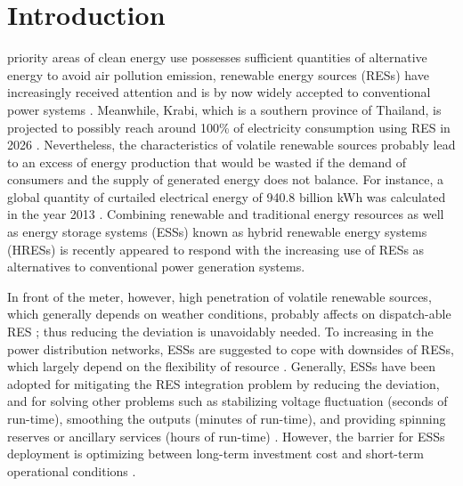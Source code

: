 \section{Introduction}
\label{sec:introduction}



 priority areas of clean energy use possesses sufficient quantities of alternative energy to avoid air pollution emission, renewable energy sources (RESs) have increasingly received attention and is by now widely accepted to conventional power systems \cite{b1,b2,b3,b4,b5-wind-data,b6}. Meanwhile, Krabi, which is a southern province of Thailand, is projected to possibly reach around 100\% of electricity consumption using RES in 2026 \cite{b7}. Nevertheless, the characteristics of volatile renewable sources probably lead to an excess of energy production that would be wasted if the demand of consumers and the supply of generated energy does not balance. For instance, a global quantity of curtailed electrical energy of 940.8 billion kWh was calculated in the year 2013 \cite{b9}. Combining renewable and traditional energy resources as well as energy storage systems (ESSs) known as hybrid renewable energy systems (HRESs) is recently appeared to respond with the increasing use of RESs as alternatives to conventional power generation systems.

\par

In front of the meter, however, high penetration of volatile renewable sources, which generally depends on weather conditions, probably affects on dispatch-able RES \cite{b10}; thus reducing the deviation is unavoidably needed. To increasing in the power distribution networks, ESSs are suggested to cope with downsides of RESs, which largely depend on the flexibility of resource \cite{b11,b12}. Generally, ESSs have been adopted for mitigating the RES integration problem by reducing the deviation, and for solving other problems such as stabilizing voltage fluctuation (seconds of run-time), smoothing the outputs (minutes of run-time), and providing spinning reserves or ancillary services (hours of run-time) \cite{b14}. However, the barrier for ESSs deployment is optimizing between long-term investment cost and short-term operational conditions \cite{13-main_barrier_ESS}. 

